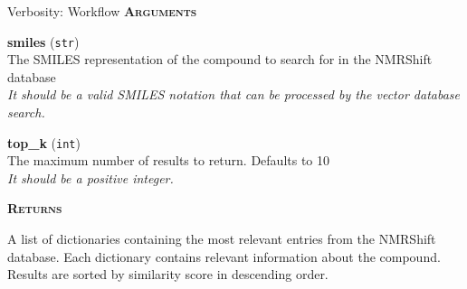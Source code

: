 \begin{hypobox}{Verbosity: Workflow}
    \medskip
   \textbf{ \textsc{Arguments}}

    \textbf{smiles} (\texttt{str})\\
    \quad The SMILES representation of the compound to search for in the NMRShift database\\
    \quad \textit{It should be a valid SMILES notation that can be processed by the vector database search.}

    \textbf{top\_k} (\texttt{int})\\
    \quad The maximum number of results to return. Defaults to 10\\
    \quad \textit{It should be a positive integer.}

    \medskip
    \textbf{\textsc{Returns}}

    \quad A list of dictionaries containing the most relevant entries from the NMRShift database. Each dictionary contains relevant information about the compound. Results are sorted by
  similarity score in descending order.
  \end{hypobox}


